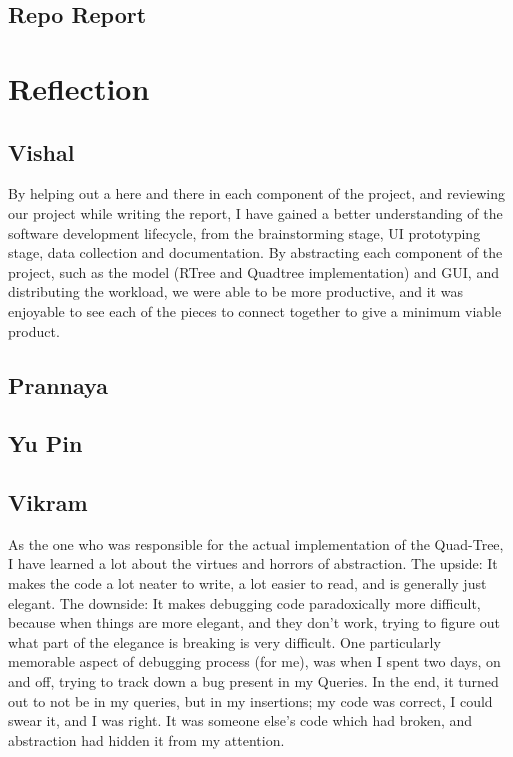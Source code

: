 \documentclass[12pt]{article}
\begin{document}
{\subsection{Repo Report}

\section{Reflection}

\subsection{Vishal}

By helping out a here and there in each component of the project, and reviewing our project while writing the report, I have gained a better understanding of the software development lifecycle, from the brainstorming stage, UI prototyping stage, data collection and documentation. By abstracting each component of the project, such as the model (RTree and Quadtree implementation) and GUI, and distributing the workload, we were able to be more productive, and it was enjoyable to see each of the pieces to connect together to give a minimum viable product.

\subsection{Prannaya}

\subsection{Yu Pin}

\subsection{Vikram}

As the one who was responsible for the actual implementation of the Quad-Tree, I have learned a lot about the virtues and horrors of abstraction. The upside: It makes the code a lot neater to write, a lot easier to read, and is generally just elegant. The downside: It makes debugging code paradoxically more difficult, because when things are more elegant, and they don't work, trying to figure out what part of the elegance is breaking is very difficult. One particularly memorable aspect of debugging process (for me), was when I spent two days, on and off, trying to track down a bug present in my Queries. In the end, it turned out to not be in my queries, but in my insertions; my code was correct, I could swear it, and I was right. It was someone else's code which had broken, and abstraction had hidden it from my attention.

}
\end{document}
